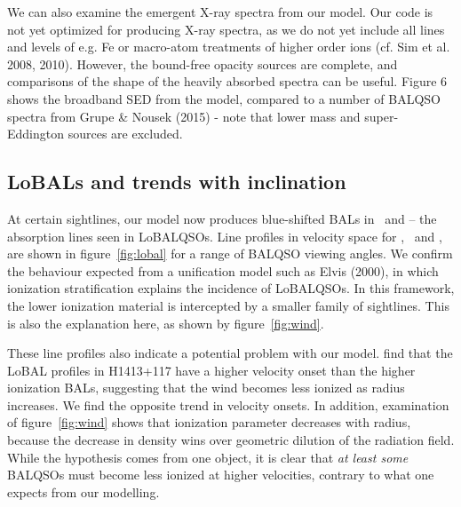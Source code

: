 \documentclass[useAMS,usenatbib]{mn2e_x}
\begin{document}
We can also examine the emergent X-ray spectra from our model. 
Our code is not yet optimized for producing X-ray spectra, as we do not yet 
include all lines and levels of e.g. Fe or macro-atom treatments of 
higher order ions (cf. Sim et al. 2008, 2010). 
However, the bound-free opacity sources are complete, and comparisons of the shape
of the heavily absorbed spectra can be useful.
Figure 6 shows the broadband SED from the model, compared to a number of BALQSO spectra
from Grupe \& Nousek (2015) - note that lower mass and super-Eddington sources
are excluded. 








\subsection{LoBALs and trends with inclination}

At certain sightlines, our model now produces blue-shifted BALs in \al\ and \mg --
the absorption lines seen in LoBALQSOs. Line profiles in velocity space 
for \civ, \al\ and \mg, are shown in figure~\ref{fig:lobal} for a range
of BALQSO viewing angles. We confirm the behaviour expected from 
a unification model such as Elvis (2000), in which ionization stratification
explains the incidence of LoBALQSOs. In this framework, the lower
ionization material is intercepted by a smaller family of sightlines.
This is also the explanation here, as shown by figure~\ref{fig:wind}.

These line profiles also indicate a potential problem with our model. 
\cite{odowd2015} find that the LoBAL profiles in H1413+117 have a 
higher velocity onset than the higher ionization BALs, suggesting that the
wind becomes less ionized as radius increases. 
We find the opposite trend in velocity onsets. In addition, examination of 
figure~\ref{fig:wind} shows that ionization parameter decreases with radius, 
because the decrease in density wins over geometric dilution of the radiation 
field. While the \cite{odowd2015} hypothesis comes from one object,
it is clear that {\em at least some} BALQSOs must become less ionized at 
higher velocities, contrary to what one expects from our modelling.
\end{document}
